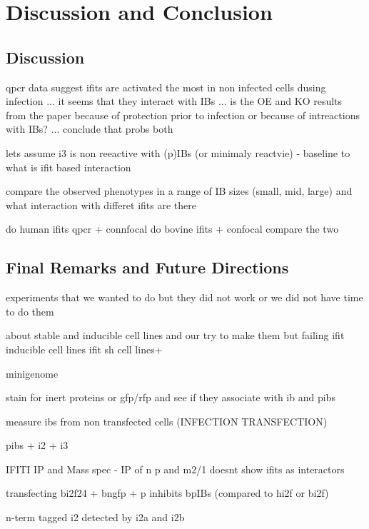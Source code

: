 \chapter{Discussion and Conclusion}
\section{Discussion}

qpcr data suggest ifits are activated the most in non infected cells dusing infection ... it seems that they interact with IBs ... is the OE and KO results from the paper because of protection prior to infection or because of intreactions with IBs? ... conclude that probs both


lets assume i3 is non reeactive with (p)IBs (or minimaly reactvie) - baseline to what is ifit based interaction

compare the observed phenotypes in a range of IB sizes (small, mid, large) and what interaction with differet ifits are there

do human ifits qpcr + connfocal
do bovine ifits  + confocal
compare the two


\section{Final Remarks and Future Directions}
experiments that we wanted to do but they did not work or we did not have time to do them


about stable and inducible cell lines and our try to make them but failing
ifit inducible cell lines
ifit sh cell lines+

minigenome

stain for inert proteins or gfp/rfp and see if they associate with ib and pibs

measure ibs from non transfected cells (INFECTION TRANSFECTION)


pibs + i2 + i3

IFITI IP and Mass spec
\cite{Oliveira2013HumanCells} - IP of n p and m2/1 doesnt show ifits as interactors

transfecting bi2f24 + bngfp + p inhibits bpIBs (compared to hi2f or bi2f)

n-term tagged i2 detected by i2a and i2b

